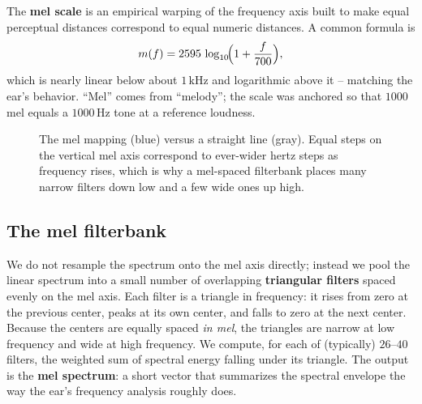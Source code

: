 The \textbf{mel scale} is an empirical warping of the frequency axis built to make
equal perceptual distances correspond to equal numeric distances. A common formula
is
\begin{equation}
\label{ch27:mel-formula}
m(f) = 2595 \, \log_{10}\!\Bigl(1 + \frac{f}{700}\Bigr),
\end{equation}
which is nearly linear below about $1$\,kHz and logarithmic above it -- matching
the ear's behavior. ``Mel'' comes from ``melody''; the scale was anchored so that
$1000$\,mel equals a $1000$\,Hz tone at a reference loudness.

\begin{figure}[H]
\centering
{}
\caption{The mel mapping (blue) versus a straight line (gray). Equal steps on the
vertical mel axis correspond to ever-wider hertz steps as frequency rises, which
is why a mel-spaced filterbank places many narrow filters down low and a few wide
ones up high.}
\label{ch27:fig-mel}
\end{figure}

\subsection*{The mel filterbank}

We do not resample the spectrum onto the mel axis directly; instead we pool the
linear spectrum into a small number of overlapping \textbf{triangular filters}
spaced evenly on the mel axis. Each filter is a triangle in frequency: it rises
from zero at the previous center, peaks at its own center, and falls to zero at
the next center. Because the centers are equally spaced \emph{in mel}, the
triangles are narrow at low frequency and wide at high frequency. We compute, for
each of (typically) $26$--$40$ filters, the weighted sum of spectral energy
falling under its triangle. The output is the \textbf{mel spectrum}: a short
vector that summarizes the spectral envelope the way the ear's frequency analysis
roughly does.

